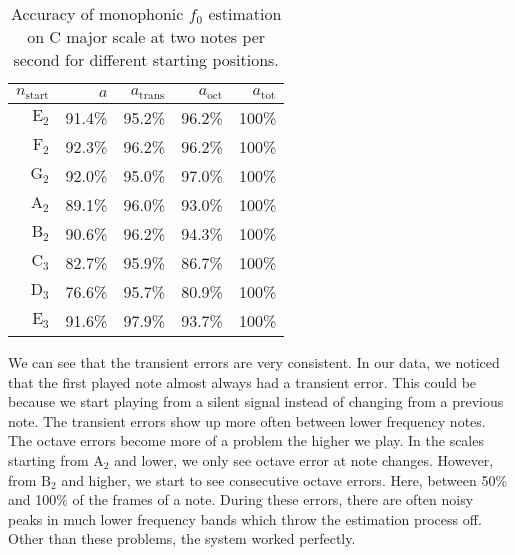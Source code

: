 \documentclass[10pt,twocolumn]{article}
\begin{document}
\begin{table}[H]\vspace{-3mm}
    \centering
    \begin{tabular}{r|rrrr}
        $n_\text{start}$ & $a$ & $a_\text{trans}$ & $a_\text{oct}$ & $a_\text{tot}$ \\
        \hline
        $\text{E}_2$ & 91.4\% & 95.2\% & 96.2\% & 100\% \\
        $\text{F}_2$ & 92.3\% & 96.2\% & 96.2\% & 100\% \\
        $\text{G}_2$ & 92.0\% & 95.0\% & 97.0\% & 100\% \\
        $\text{A}_2$ & 89.1\% & 96.0\% & 93.0\% & 100\% \\
        $\text{B}_2$ & 90.6\% & 96.2\% & 94.3\% & 100\% \\
        $\text{C}_3$ & 82.7\% & 95.9\% & 86.7\% & 100\% \\
        $\text{D}_3$ & 76.6\% & 95.7\% & 80.9\% & 100\% \\
        $\text{E}_3$ & 91.6\% & 97.9\% & 93.7\% & 100\%
    \end{tabular}
    \caption{Accuracy of monophonic $f_0$ estimation on C major scale at two notes per second for different starting positions.}
    \label{tab:monperf}
\end{table}\vspace{-3mm}
We can see that the transient errors are very consistent. In our data, we noticed that the first played note almost always had a transient error. This could be because we start playing from a silent signal instead of changing from a previous note. The transient errors show up more often between lower frequency notes. The octave errors become more of a problem the higher we play. In the scales starting from $\text{A}_2$ and lower, we only see octave error at note changes. However, from $\text{B}_2$ and higher, we start to see consecutive octave errors. Here, between 50\% and 100\% of the frames of a note. During these errors, there are often noisy peaks in much lower frequency bands which throw the estimation process off. Other than these problems, the system worked perfectly.
\end{document}
